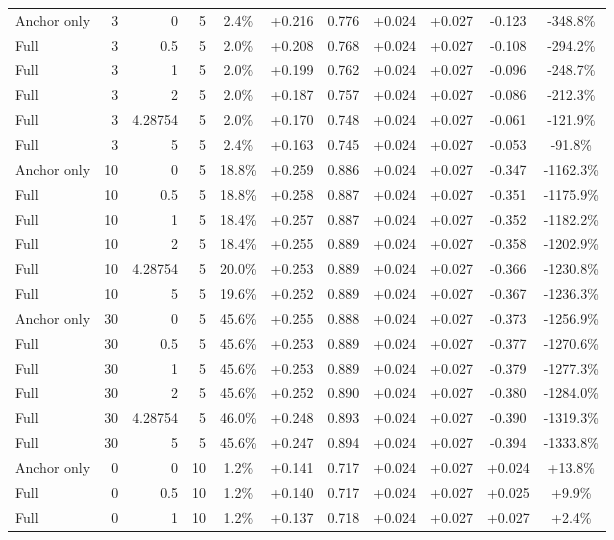 \begin{table}[htbp]
\begin{tabular}{lrrrccccccc}
Anchor only & 3 & 0 & 5 & 2.4\% & +0.216 & 0.776 & +0.024 & +0.027 & -0.123 & -348.8\% \\
Full & 3 & 0.5 & 5 & 2.0\% & +0.208 & 0.768 & +0.024 & +0.027 & -0.108 & -294.2\% \\
Full & 3 & 1 & 5 & 2.0\% & +0.199 & 0.762 & +0.024 & +0.027 & -0.096 & -248.7\% \\
Full & 3 & 2 & 5 & 2.0\% & +0.187 & 0.757 & +0.024 & +0.027 & -0.086 & -212.3\% \\
Full & 3 & 4.28754 & 5 & 2.0\% & +0.170 & 0.748 & +0.024 & +0.027 & -0.061 & -121.9\% \\
Full & 3 & 5 & 5 & 2.4\% & +0.163 & 0.745 & +0.024 & +0.027 & -0.053 & -91.8\% \\
Anchor only & 10 & 0 & 5 & 18.8\% & +0.259 & 0.886 & +0.024 & +0.027 & -0.347 & -1162.3\% \\
Full & 10 & 0.5 & 5 & 18.8\% & +0.258 & 0.887 & +0.024 & +0.027 & -0.351 & -1175.9\% \\
Full & 10 & 1 & 5 & 18.4\% & +0.257 & 0.887 & +0.024 & +0.027 & -0.352 & -1182.2\% \\
Full & 10 & 2 & 5 & 18.4\% & +0.255 & 0.889 & +0.024 & +0.027 & -0.358 & -1202.9\% \\
Full & 10 & 4.28754 & 5 & 20.0\% & +0.253 & 0.889 & +0.024 & +0.027 & -0.366 & -1230.8\% \\
Full & 10 & 5 & 5 & 19.6\% & +0.252 & 0.889 & +0.024 & +0.027 & -0.367 & -1236.3\% \\
Anchor only & 30 & 0 & 5 & 45.6\% & +0.255 & 0.888 & +0.024 & +0.027 & -0.373 & -1256.9\% \\
Full & 30 & 0.5 & 5 & 45.6\% & +0.253 & 0.889 & +0.024 & +0.027 & -0.377 & -1270.6\% \\
Full & 30 & 1 & 5 & 45.6\% & +0.253 & 0.889 & +0.024 & +0.027 & -0.379 & -1277.3\% \\
Full & 30 & 2 & 5 & 45.6\% & +0.252 & 0.890 & +0.024 & +0.027 & -0.380 & -1284.0\% \\
Full & 30 & 4.28754 & 5 & 46.0\% & +0.248 & 0.893 & +0.024 & +0.027 & -0.390 & -1319.3\% \\
Full & 30 & 5 & 5 & 45.6\% & +0.247 & 0.894 & +0.024 & +0.027 & -0.394 & -1333.8\% \\
Anchor only & 0 & 0 & 10 & 1.2\% & +0.141 & 0.717 & +0.024 & +0.027 & +0.024 & +13.8\% \\
Full & 0 & 0.5 & 10 & 1.2\% & +0.140 & 0.717 & +0.024 & +0.027 & +0.025 & +9.9\% \\
Full & 0 & 1 & 10 & 1.2\% & +0.137 & 0.718 & +0.024 & +0.027 & +0.027 & +2.4\% \\

\end{tabular}
\end{table}

